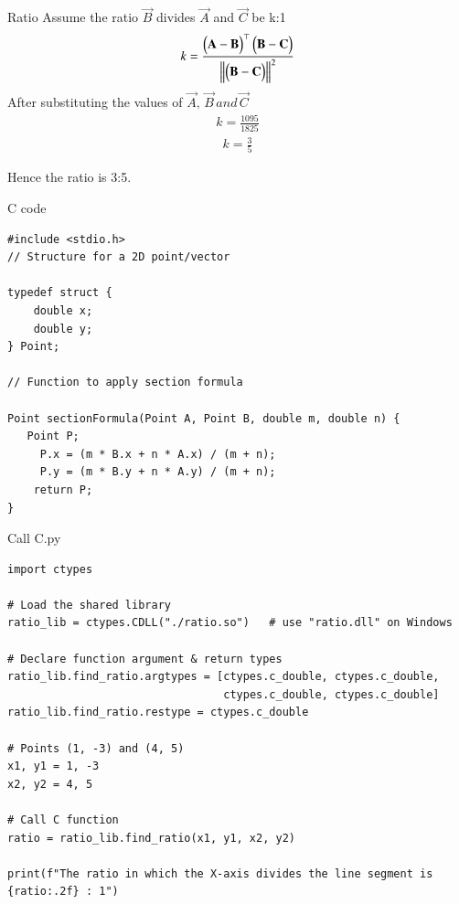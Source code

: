 \documentclass{beamer}
\begin{document}
\begin{frame}{Ratio}
Assume the ratio $\vec{B}$ divides $\vec{A}$  and $\vec{C}$ be k:1
\begin{align}
    k = \frac{\begin{pmatrix}\mathbf{A} - \mathbf{B}\end{pmatrix}^\top \begin{pmatrix}\mathbf{B} - \mathbf{C}\end{pmatrix}}{\left\lVert\begin{pmatrix}\mathbf{B} - \mathbf{C}\end{pmatrix}\right\rVert^2}
\end{align}
After substituting the values of $\vec{A},\, \vec{B} \, and \, \vec{C}$
\begin{align}
    k = \frac{1095}{1825}
\end{align}
\begin{align}
    k = \frac{3}{5}
\end{align}
\centering
\begin{large}Hence the ratio is 3:5.\end{large}
\end{frame}

\begin{frame}[fragile]{C code}
\begin{lstlisting}
#include <stdio.h>
// Structure for a 2D point/vector

typedef struct {
    double x;
    double y;
} Point;

// Function to apply section formula

Point sectionFormula(Point A, Point B, double m, double n) {
   Point P;
     P.x = (m * B.x + n * A.x) / (m + n);
     P.y = (m * B.y + n * A.y) / (m + n);
    return P;
}
\end{lstlisting}
\end{frame}

\begin{frame}[fragile]{Call C.py}
\begin{lstlisting}
import ctypes

# Load the shared library
ratio_lib = ctypes.CDLL("./ratio.so")   # use "ratio.dll" on Windows

# Declare function argument & return types
ratio_lib.find_ratio.argtypes = [ctypes.c_double, ctypes.c_double,
                                 ctypes.c_double, ctypes.c_double]
ratio_lib.find_ratio.restype = ctypes.c_double

# Points (1, -3) and (4, 5)
x1, y1 = 1, -3
x2, y2 = 4, 5

# Call C function
ratio = ratio_lib.find_ratio(x1, y1, x2, y2)

print(f"The ratio in which the X-axis divides the line segment is {ratio:.2f} : 1")
\end{lstlisting}
\end{frame}
\end{document}

